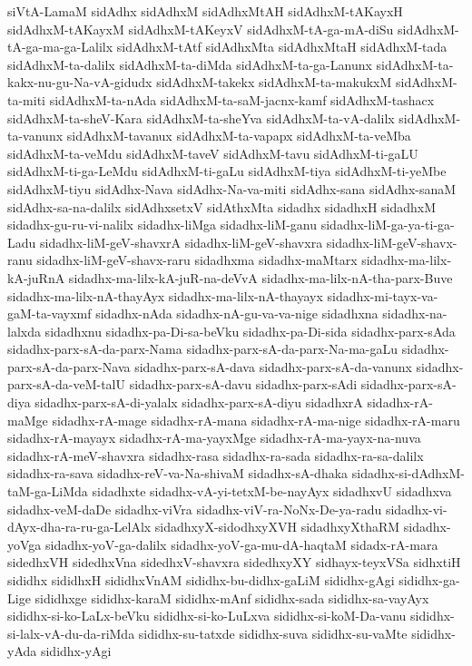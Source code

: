 {siVtA-LamaM
sidAdhx
sidAdhxM
sidAdhxMtAH
sidAdhxM-tAKayxH
sidAdhxM-tAKayxM
sidAdhxM-tAKeyxV
sidAdhxM-tA-ga-mA-diSu
sidAdhxM-tA-ga-ma-ga-Lalilx
sidAdhxM-tAtf
sidAdhxMta
sidAdhxMtaH
sidAdhxM-tada
sidAdhxM-ta-dalilx
sidAdhxM-ta-diMda
sidAdhxM-ta-ga-Lanunx
sidAdhxM-ta-kakx-nu-gu-Na-vA-gidudx
sidAdhxM-takekx
sidAdhxM-ta-makukxM
sidAdhxM-ta-miti
sidAdhxM-ta-nAda
sidAdhxM-ta-saM-jacnx-kamf
sidAdhxM-tashacx
sidAdhxM-ta-sheV-Kara
sidAdhxM-ta-sheYva
sidAdhxM-ta-vA-dalilx
sidAdhxM-ta-vanunx
sidAdhxM-tavanux
sidAdhxM-ta-vapapx
sidAdhxM-ta-veMba
sidAdhxM-ta-veMdu
sidAdhxM-taveV
sidAdhxM-tavu
sidAdhxM-ti-gaLU
sidAdhxM-ti-ga-LeMdu
sidAdhxM-ti-gaLu
sidAdhxM-tiya
sidAdhxM-ti-yeMbe
sidAdhxM-tiyu
sidAdhx-Nava
sidAdhx-Na-va-miti
sidAdhx-sana
sidAdhx-sanaM
sidAdhx-sa-na-dalilx
sidAdhxsetxV
sidAthxMta
sidadhx
sidadhxH
sidadhxM
sidadhx-gu-ru-vi-nalilx
sidadhx-liMga
sidadhx-liM-ganu
sidadhx-liM-ga-ya-ti-ga-Ladu
sidadhx-liM-geV-shavxrA
sidadhx-liM-geV-shavxra
sidadhx-liM-geV-shavx-ranu
sidadhx-liM-geV-shavx-raru
sidadhxma
sidadhx-maMtarx
sidadhx-ma-lilx-kA-juRnA
sidadhx-ma-lilx-kA-juR-na-deVvA
sidadhx-ma-lilx-nA-tha-parx-Buve
sidadhx-ma-lilx-nA-thayAyx
sidadhx-ma-lilx-nA-thayayx
sidadhx-mi-tayx-va-gaM-ta-vayxmf
sidadhx-nAda
sidadhx-nA-gu-va-va-nige
sidadhxna
sidadhx-na-lalxda
sidadhxnu
sidadhx-pa-Di-sa-beVku
sidadhx-pa-Di-sida
sidadhx-parx-sAda
sidadhx-parx-sA-da-parx-Nama
sidadhx-parx-sA-da-parx-Na-ma-gaLu
sidadhx-parx-sA-da-parx-Nava
sidadhx-parx-sA-dava
sidadhx-parx-sA-da-vanunx
sidadhx-parx-sA-da-veM-talU
sidadhx-parx-sA-davu
sidadhx-parx-sAdi
sidadhx-parx-sA-diya
sidadhx-parx-sA-di-yalalx
sidadhx-parx-sA-diyu
sidadhxrA
sidadhx-rA-maMge
sidadhx-rA-mage
sidadhx-rA-mana
sidadhx-rA-ma-nige
sidadhx-rA-maru
sidadhx-rA-mayayx
sidadhx-rA-ma-yayxMge
sidadhx-rA-ma-yayx-na-nuva
sidadhx-rA-meV-shavxra
sidadhx-rasa
sidadhx-ra-sada
sidadhx-ra-sa-dalilx
sidadhx-ra-sava
sidadhx-reV-va-Na-shivaM
sidadhx-sA-dhaka
sidadhx-si-dAdhxM-taM-ga-LiMda
sidadhxte
sidadhx-vA-yi-tetxM-be-nayAyx
sidadhxvU
sidadhxva
sidadhx-veM-daDe
sidadhx-viVra
sidadhx-viV-ra-NoNx-De-ya-radu
sidadhx-vi-dAyx-dha-ra-ru-ga-LelAlx
sidadhxyX-sidodhxyXVH
sidadhxyXthaRM
sidadhx-yoVga
sidadhx-yoV-ga-dalilx
sidadhx-yoV-ga-mu-dA-haqtaM
sidadx-rA-mara
sidedhxVH
sidedhxVna
sidedhxV-shavxra
sidedhxyXY
sidhayx-teyxVSa
sidhxtiH
sididhx
sididhxH
sididhxVnAM
sididhx-bu-didhx-gaLiM
sididhx-gAgi
sididhx-ga-Lige
sididhxge
sididhx-karaM
sididhx-mAnf
sididhx-sada
sididhx-sa-vayAyx
sididhx-si-ko-LaLx-beVku
sididhx-si-ko-LuLxva
sididhx-si-koM-Da-vanu
sididhx-si-lalx-vA-du-da-riMda
sididhx-su-tatxde
sididhx-suva
sididhx-su-vaMte
sididhx-yAda
sididhx-yAgi
}
